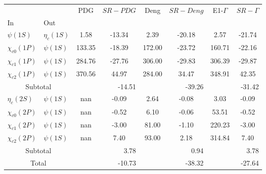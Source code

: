 \begin{tabular}{|l|l|c|c|c|c|c|c|}%
\hline%
&&PDG&$SR-PDG$&Deng&$SR-Deng$&E1-$\Gamma$&$SR-\Gamma$\\%
In&Out&&&&&&\\%
\hline%
$\psi(1S)$&$\eta_{c}(1S)$&1.58&-13.34&2.39&-20.18&2.57&-21.74\\%
$\chi_{c0}(1P)$&$\psi(1S)$&133.35&-18.39&172.00&-23.72&160.71&-22.16\\%
$\chi_{c1}(1P)$&$\psi(1S)$&284.76&-27.76&306.00&-29.83&306.39&-29.87\\%
$\chi_{c2}(1P)$&$\psi(1S)$&370.56&44.97&284.00&34.47&348.91&42.35\\%
\hline%
\hline%
\multicolumn{2}{|c|}{Subtotal}&\multicolumn{2}{|r|}{{-}14.51}&\multicolumn{2}{|r|}{{-}39.26}&\multicolumn{2}{|r|}{{-}31.42}\\%
\hline%
\hline%
$\eta_{c}(2S)$&$\psi(1S)$&nan&-0.09&2.64&-0.08&3.03&-0.09\\%
$\chi_{c0}(2P)$&$\psi(1S)$&nan&-0.52&6.10&-0.06&53.51&-0.52\\%
$\chi_{c1}(2P)$&$\psi(1S)$&nan&-3.00&81.00&-1.10&220.23&-3.00\\%
$\chi_{c2}(2P)$&$\psi(1S)$&nan&7.40&93.00&2.18&314.84&7.40\\%
\hline%
\hline%
\multicolumn{2}{|c|}{Subtotal}&\multicolumn{2}{|r|}{3.78}&\multicolumn{2}{|r|}{0.94}&\multicolumn{2}{|r|}{3.78}\\%
\hline%
\hline%
\multicolumn{2}{|c|}{Total}&\multicolumn{2}{|r|}{{-}10.73}&\multicolumn{2}{|r|}{{-}38.32}&\multicolumn{2}{|r|}{{-}27.64}\\%
\hline%
\end{tabular}